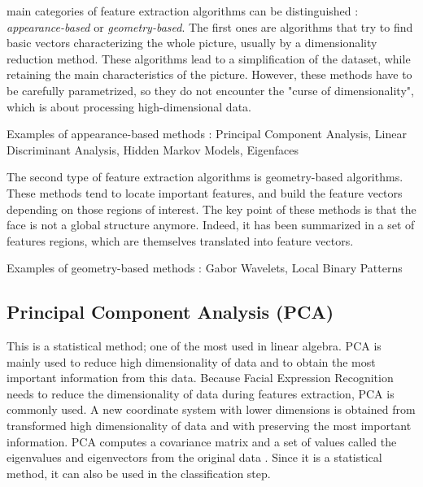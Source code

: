  main categories of feature extraction algorithms can be distinguished : \textit{appearance-based} or \textit{geometry-based}. The first ones are algorithms that try to find basic vectors characterizing the whole picture, usually by a dimensionality reduction method. These algorithms lead to a simplification of the dataset, while retaining the main characteristics of the picture. However, these methods have to be carefully parametrized, so they do not encounter the "curse of dimensionality", which is about processing high-dimensional data.
\vspace{\baselineskip}

\noindent Examples of appearance-based methods : Principal Component Analysis, Linear Discriminant Analysis, Hidden Markov Models, Eigenfaces
\newline

\noindent The second type of feature extraction algorithms is geometry-based algorithms. These methods tend to locate important features, and build the feature vectors depending on those regions of interest. The key point of these methods is that the face is not a global structure anymore. Indeed, it has been summarized in a set of features regions, which are themselves translated into feature vectors.
\vspace{\baselineskip}

\noindent Examples of geometry-based methods : Gabor Wavelets, Local Binary Patterns
\newline

\subsection{Principal Component Analysis (PCA)}

\vspace{\baselineskip}
\noindent This is a statistical method; one of the most used in linear algebra. PCA is mainly used to reduce high dimensionality of data and to obtain the most important information from this data. Because Facial Expression Recognition needs to reduce the dimensionality of data during features extraction, PCA is commonly used. A new coordinate system with lower dimensions is obtained from transformed high dimensionality of data and with preserving the most important information. PCA computes a covariance matrix and a set of values called the eigenvalues and eigenvectors from the original data \cite{GAN08}. Since it is a statistical method, it can also be used in the classification step.
\newline

